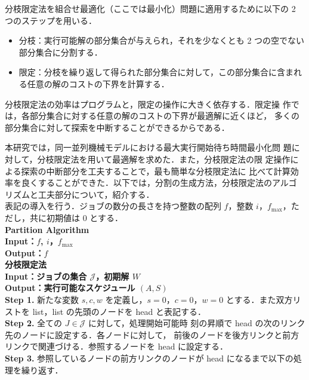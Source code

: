 \documentclass[12pt]{optlab-bachelor}
\begin{document}
  分枝限定法を組合せ最適化（ここでは最小化）問題に適用するために以下の 2 つのステップを用いる．
  \begin{itemize}
    \item 分枝：実行可能解の部分集合が与えられ，それを少なくとも 2 つの空でない部分集合に分割する．
    \item 限定：分枝を繰り返して得られた部分集合に対して，この部分集合に含まれる任意の解のコストの下界を計算する．
  \end{itemize}
  分枝限定法の効率はプログラムと，限定の操作に大きく依存する．限定操
  作では，各部分集合に対する任意の解のコストの下界が最適解に近くほど，
  多くの部分集合に対して探索を中断することができるからである．

  本研究では，同一並列機械モデルにおける最大実行開始待ち時間最小化問
  題に対して，分枝限定法を用いて最適解を求めた．また，分枝限定法の限
  定操作による探索の中断部分を工夫することで，最も簡単な分枝限定法に
  比べて計算効率を良くすることができた．以下では，分割の生成方法，分枝限定法のアルゴ
  リズムと工夫部分について，紹介する．\\

  表記の導入を行う．ジョブの数分の長さを持つ整数の配列 $f$，整数 $i$，$f_{\max}$，ただし，共に初期値は 0 とする．\\
  \noindent\textbf{Partition Algorithm}\\
  \noindent\textbf{Input：$f$, $i$，$f_{\max}$}\\
  \noindent\textbf{Output：$f$}\\



  \noindent\textbf{分枝限定法}\\
  \noindent\textbf{Input：ジョブの集合 $\mathcal{J}$，初期解 $W$}\\
  \noindent\textbf{Output：実行可能なスケジュール $(A,S)$}\\

  \textbf{Step 1.} 新たな変数 $s,c,w$ を定義し，$s = 0$，$c = 0$，$w =
  0$ とする．また双方リストを list，list の先頭のノードを head と表記する．\\

  \textbf{Step 2.} 全ての $J \in \mathcal{J}$ に対して，処理開始可能時
  刻の昇順で head の次のリンク先のノードに設定する．各ノードに対して，
  前後のノードを後方リンクと前方リンクで関連づける．参照するノードを
  head に設定する．\\

  \textbf{Step 3.} 参照しているノードの前方リンクのノードが head になるまで以下の処
  理を繰り返す．\\
\end{document}
